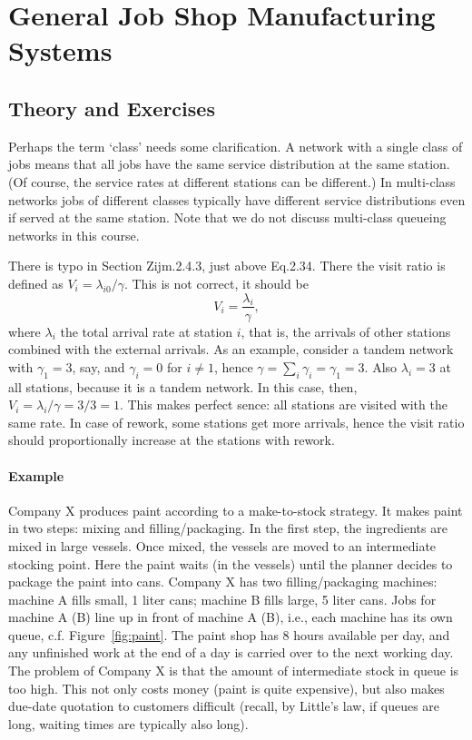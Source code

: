 

\section{General Job Shop Manufacturing Systems}
\label{sec:general-job-shop}

\subsection*{Theory and Exercises}


Perhaps the term `class' needs some clarification. A network with a
single class of jobs means that all jobs have the same service
distribution at the same station. (Of course, the service rates at
different stations can be different.) In multi-class networks jobs of
different classes typically have different service distributions even
if served at the same station. Note that we do not discuss multi-class
queueing networks in this course.

There is typo in Section Zijm.2.4.3, just above Eq.2.34. There the visit ratio is defined as $V_i=\lambda_{i0}/\gamma$. This is not correct, it should be
\begin{equation*}
  V_i = \frac{\lambda_i}{\gamma},
\end{equation*}
where $\lambda_i$ the total arrival rate at station $i$, that is, the
arrivals of other stations combined with the external arrivals. As an
example, consider a tandem network with $\gamma_{1} = 3$, say, and
$\gamma_i=0$ for $i\neq 1$, hence
$\gamma=\sum_i \gamma_i = \gamma_1 = 3$. Also $\lambda_i = 3$ at all
stations, because it is a tandem network. In this case, then,
$V_i = \lambda_i/\gamma = 3/3 = 1$. This makes perfect sence: all
stations are visited with the same rate.  In case of rework, some
stations get more arrivals, hence the visit ratio should
proportionally increase at the stations with rework.

\paragraph{Example}

Company X produces paint according to a make-to-stock strategy. It
makes paint in two steps: mixing and filling/packaging. In the first
step, the ingredients are mixed in large vessels. Once mixed, the
vessels are moved to an intermediate stocking point. Here the paint
waits (in the vessels) until the planner decides to package the paint
into cans. Company X has two filling/packaging machines: machine A
fills small, 1 liter cans; machine B fills large, 5 liter cans. Jobs
for machine A (B) line up in front of machine A (B), i.e., each
machine has its own queue, c.f. Figure~\ref{fig:paint}. The paint shop
has 8 hours available per day, and any unfinished work at the end of a
day is carried over to the next working day. The problem of Company X
is that the amount of intermediate stock in queue is too high. This
not only costs money (paint is quite expensive), but also makes
due-date quotation to customers difficult (recall, by Little's law, if
queues are long, waiting times are typically also long).


